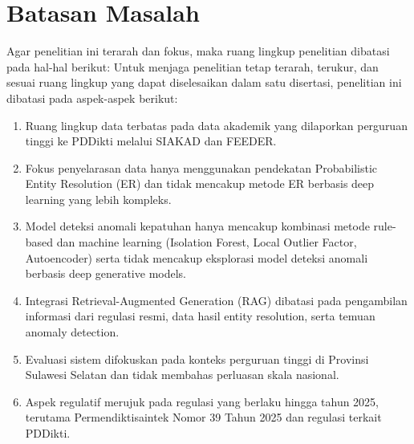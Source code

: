 \documentclass[12pt,a4paper,oneside]{report}
\begin{document}
        \section{Batasan Masalah}
            Agar penelitian ini terarah dan fokus, maka ruang lingkup penelitian dibatasi pada hal-hal berikut:
            Untuk menjaga penelitian tetap terarah, terukur, dan sesuai ruang lingkup yang dapat diselesaikan dalam satu disertasi, penelitian ini dibatasi pada aspek-aspek berikut:
            \begin{enumerate}
                \item Ruang lingkup data terbatas pada data akademik yang dilaporkan perguruan tinggi ke PDDikti melalui SIAKAD dan FEEDER.
                \item Fokus penyelarasan data hanya menggunakan pendekatan Probabilistic Entity Resolution (ER) dan tidak mencakup metode ER berbasis deep learning yang lebih kompleks.
                \item Model deteksi anomali kepatuhan hanya mencakup kombinasi metode rule-based dan machine learning (Isolation Forest, Local Outlier Factor, Autoencoder) serta tidak mencakup eksplorasi model deteksi anomali berbasis deep generative models.
                \item Integrasi Retrieval-Augmented Generation (RAG) dibatasi pada pengambilan informasi dari regulasi resmi, data hasil entity resolution, serta temuan anomaly detection.
                \item Evaluasi sistem difokuskan pada konteks perguruan tinggi di Provinsi Sulawesi Selatan dan tidak membahas perluasan skala nasional.
                \item Aspek regulatif merujuk pada regulasi yang berlaku hingga tahun 2025, terutama Permendiktisaintek Nomor 39 Tahun 2025 dan regulasi terkait PDDikti.
            \end{enumerate}
\end{document}
